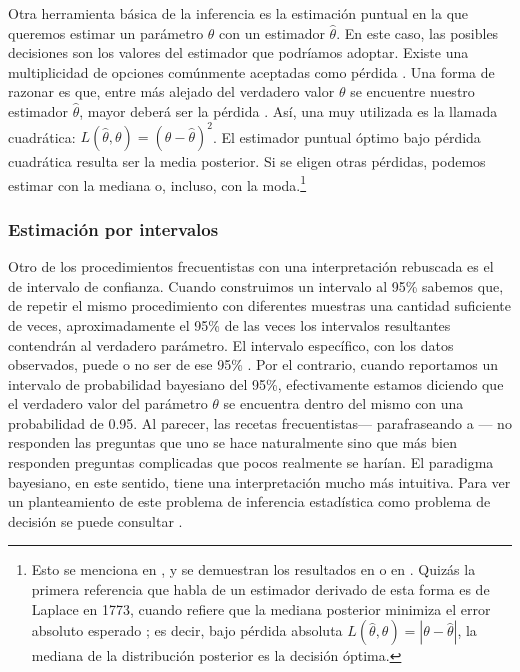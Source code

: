 Otra herramienta básica de la inferencia es la estimación puntual en la que queremos estimar un parámetro $\theta$ con un estimador $\hat{\theta}$. En este caso, las posibles decisiones son los valores del estimador que podríamos adoptar. Existe una multiplicidad de opciones comúnmente aceptadas como pérdida \parencite{Berger85,Mendoza11,Nieto16}. Una forma de razonar es que, entre más alejado del verdadero valor $\theta$ se encuentre nuestro estimador $\hat{\theta}$, mayor deberá ser la pérdida \parencite[53]{Mendoza11}. Así, una muy utilizada es la llamada cuadrática: $L(\hat{\theta},\theta)=(\theta-\hat{\theta})^2$. El estimador puntual óptimo bajo pérdida cuadrática resulta ser la media posterior. Si se eligen otras pérdidas, podemos estimar con la mediana o, incluso, con la moda.\footnote{Esto se menciona en \textcite{Berger85}, \textcite{Nieto16} y se demuestran los resultados en \textcite[39-43]{Usi14} o en \textcite[234-240]{Lee12}. Quizás la primera referencia que habla de un estimador derivado de esta forma es de Laplace en 1773, cuando refiere que la mediana posterior minimiza el error absoluto esperado \parencite[12, Ejemplo 1.2.5]{Robert07}; es decir, bajo pérdida absoluta $L(\hat{\theta},\theta)=|\theta-\hat{\theta}|$, la mediana de la distribución posterior es la decisión óptima.}

\subsubsection*{Estimación por intervalos}

Otro de los procedimientos frecuentistas con una interpretación rebuscada es el de intervalo de confianza. Cuando construimos un intervalo al 95\% sabemos que, de repetir el mismo procedimiento con diferentes muestras una cantidad suficiente de veces, aproximadamente el 95\% de las veces los intervalos resultantes contendrán al verdadero parámetro. El intervalo específico, con los datos observados, puede o no ser de ese 95\% \parencite[p. 2]{Congdon06}. Por el contrario, cuando reportamos un intervalo de probabilidad bayesiano del 95\%, efectivamente estamos diciendo que el verdadero valor del parámetro $\theta$ se encuentra dentro del mismo con una probabilidad de 0.95. Al parecer, las recetas frecuentistas--- parafraseando a \textcite[p. xxi]{Lee12}--- no responden las preguntas que uno se hace naturalmente sino que más bien responden preguntas complicadas que pocos realmente se harían. El paradigma bayesiano, en este sentido, tiene una interpretación mucho más intuitiva. Para ver un planteamiento de este problema de inferencia estadística como problema de decisión se puede consultar \textcite[pp. 56-58]{Mendoza11}. 

